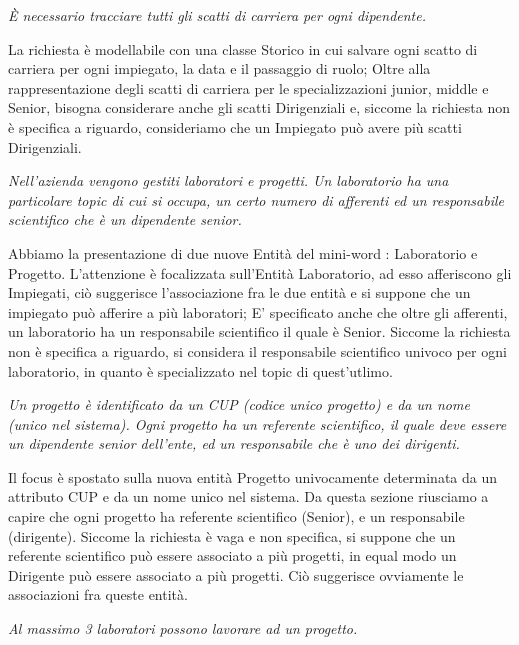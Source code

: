 \begin{displayquote}\textit{
 È necessario tracciare tutti gli scatti di carriera per ogni dipendente.
}\end{displayquote}
La richiesta è modellabile con una classe Storico in cui salvare ogni scatto di carriera per ogni impiegato, la data e il passaggio di ruolo; Oltre alla rappresentazione degli scatti di carriera per le specializzazioni junior, middle e Senior, bisogna considerare anche gli scatti Dirigenziali e, siccome la richiesta non è specifica a riguardo, consideriamo che un Impiegato può avere più scatti Dirigenziali.

\begin{displayquote}
\newpage
\textit{
Nell’azienda vengono gestiti laboratori e progetti. Un laboratorio ha una particolare topic di cui si occupa, un certo numero di afferenti ed un responsabile scientifico che è un dipendente senior.
}\end{displayquote}

Abbiamo la presentazione di due nuove Entità del mini-word : Laboratorio e Progetto.
L'attenzione è focalizzata sull'Entità Laboratorio, ad esso afferiscono gli Impiegati, ciò suggerisce l'associazione fra le due entità e si suppone che un impiegato può afferire a più laboratori; E' specificato anche che oltre gli afferenti, un laboratorio ha un responsabile scientifico il quale è Senior. Siccome la richiesta non è specifica a riguardo, si considera il responsabile scientifico univoco per ogni laboratorio, in quanto è specializzato nel topic di quest'utlimo.

\begin{displayquote}\textit{
Un progetto è identificato da un CUP (codice unico progetto) e da un nome (unico nel sistema). Ogni progetto ha un referente scientifico, il quale deve essere un dipendente senior dell’ente, ed un responsabile che è uno dei dirigenti.
}\end{displayquote}

Il focus è spostato sulla nuova entità Progetto univocamente determinata da un attributo CUP e da un nome unico nel sistema. Da questa sezione riusciamo a capire che ogni progetto ha referente scientifico (Senior), e un responsabile (dirigente). Siccome la richiesta è vaga e non specifica, si suppone che un referente scientifico può essere associato a più progetti, in equal modo un Dirigente può essere associato a più progetti.
Ciò suggerisce ovviamente le associazioni fra queste entità.

\begin{displayquote}\textit{
Al massimo 3 laboratori possono lavorare ad un progetto.
}\end{displayquote}

